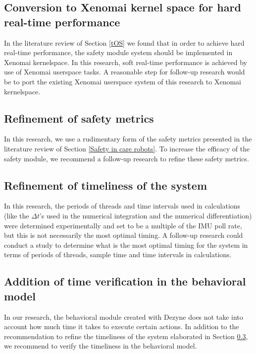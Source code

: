 \documentclass[12pt]{scrreprt}
\begin{document}
\subsection{Conversion to Xenomai kernel space for hard real-time performance}
In the literature review of Section \ref{tOS} we found that in order to achieve hard real-time performance, the safety module system should be implemented in Xenomai kernelspace. In this research, soft real-time performance is achieved by use of Xenomai userspace tasks. A reasonable step for follow-up research would be to port the existing Xenomai userspace system of this research to Xenomai kernelspace.

\subsection{Refinement of safety metrics}
\label{Refinement of safety metrics}
In this research, we use a rudimentary form of the safety metrics presented in the literature review of Section \ref{Safety in care robots}. To increase the efficacy of the safety module, we recommend a follow-up research to refine these safety metrics.

\subsection{Refinement of timeliness of the system}
\label{Refinement of timeliness of the system and scheduling}
In this research, the periods of threads and time intervals used in calculations (like the $\Delta t$'s used in the numerical integration and the numerical differentiation) were determined experimentally and set to be a multiple of the IMU poll rate, but this is not necessarily the most optimal timing. A follow-up research could conduct a study to determine what is the most optimal timing for the system in terms of periods of threads, sample time and time intervals in calculations.

\subsection{Addition of time verification in the behavioral model}
\label{Addition of time verification in the behavioral model}
In our research, the behavioral module created with Dezyne does not take into account how much time it takes to execute certain actions. In addition to the recommendation to refine the timeliness of the system elaborated in Section \ref{Refinement of timeliness of the system and scheduling}, we recommend to verify the timeliness in the behavioral model.
\end{document}
